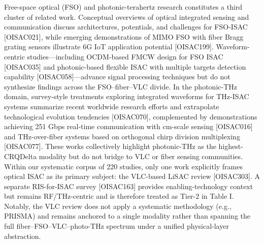 {} Free-space optical (FSO) and photonic-terahertz research constitutes a third cluster of related work. Conceptual overviews of optical integrated sensing and communication discuss architectures, potentials, and challenges for FSO-ISAC [O\markdownRendererUnderscore{}ISAC\markdownRendererUnderscore{}021], while emerging demonstrations of MIMO FSO with fiber Bragg grating sensors illustrate 6G IoT application potential [O\markdownRendererUnderscore{}ISAC\markdownRendererUnderscore{}199]. Waveform-centric studies—including OCDM-based FMCW design for FSO ISAC [O\markdownRendererUnderscore{}ISAC\markdownRendererUnderscore{}035] and photonic-based flexible ISAC with multiple targets detection capability [O\markdownRendererUnderscore{}ISAC\markdownRendererUnderscore{}058]—advance signal processing techniques but do not synthesize findings across the FSO–fiber–VLC divide. In the photonic-THz domain, survey-style treatments exploring integrated waveforms for THz-ISAC systems summarize recent worldwide research efforts and extrapolate technological evolution tendencies [O\markdownRendererUnderscore{}ISAC\markdownRendererUnderscore{}070], complemented by demonstrations achieving 251 Gbps real-time communication with cm-scale sensing [O\markdownRendererUnderscore{}ISAC\markdownRendererUnderscore{}016] and THz-over-fiber systems based on orthogonal chirp division multiplexing [O\markdownRendererUnderscore{}ISAC\markdownRendererUnderscore{}077]. These works collectively highlight photonic-THz as the highest-CRQ\markdownRendererDollarSign{}\markdownRendererUnderscore{}\markdownRendererLeftBrace{}\markdownRendererBackslash{}Delta\markdownRendererRightBrace{}\markdownRendererDollarSign{} modality but do not bridge to VLC or fiber sensing communities.\markdownRendererParagraphSeparator
{} Within our systematic corpus of 220 studies, only one work explicitly frames optical ISAC as its primary subject: the VLC-based LiSAC review [O\markdownRendererUnderscore{}ISAC\markdownRendererUnderscore{}303]. A separate RIS-for-ISAC survey [O\markdownRendererUnderscore{}ISAC\markdownRendererUnderscore{}163] provides enabling-technology context but remains RF/THz-centric and is therefore treated as Tier-2 in Table I. Notably, the VLC review does not apply a systematic methodology (e.g., PRISMA) and remains anchored to a single modality rather than spanning the full fiber–FSO–VLC–photo-THz spectrum under a unified physical-layer abstraction.\markdownRendererParagraphSeparator
